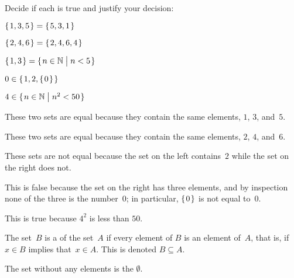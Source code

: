 \documentclass{test}  %
\begin{document}
\begin{ex} Decide if each is true and justify your decision:
\begin{items}
\item $\mbox{$\{\hspace{0.1em}1,3,5\hspace{0.1em}\}$}=\mbox{$\{\hspace{0.1em}5,3,1\hspace{0.1em}\}$}$    
\item $\mbox{$\{\hspace{0.1em}2, 4, 6\hspace{0.1em}\}$}=\mbox{$\{\hspace{0.1em}2, 4, 6, 4\hspace{0.1em}\}$}$    
\item $\mbox{$\{\hspace{0.1em}1, 3\hspace{0.1em}\}$}=\mbox{$\{\hspace{0.1em}n\in\mathbb{N}\bigm| n<5\hspace{0.1em}\}$}$ 
\item $0\in\mbox{$\{\hspace{0.1em}1,2,\mbox{$\{\hspace{0.1em}0\hspace{0.1em}\}$}\hspace{0.1em}\}$}$   
\item $4\in\mbox{$\{\hspace{0.1em}n\in\mathbb{N}\bigm| n^2<50\hspace{0.1em}\}$}$
\end{items}
\begin{ans}
\begin{items}
\item These two sets are equal because they contain the same elements, 
  $1$, $3$, and~$5$.
\item These two sets are equal because they contain the same elements, 
  $2$, $4$, and~$6$.
\item These sets are not equal because the set on the left contains~$2$
  while the set on the right does not.
\item This is false because the set on the right has three elements, 
  and by inspection none of the three is the number~$0$;
  in particular, $\mbox{$\{\hspace{0.1em}0\hspace{0.1em}\}$}$ is not equal to~$0$.
\item This is true because $4^2$ is less than $50$.    
\end{items}
\end{ans}
\end{ex}

\begin{df}
The set~$B$ is a  of the set~$A$
if every element of $B$ is an element of~$A$,
that is, if $x\in B$ implies that~$x\in A$.
This is denoted $B\subseteq A$.
\end{df}

\begin{df}
The set without any elements is the  $\emptyset$.  
\end{df}
\end{document}
